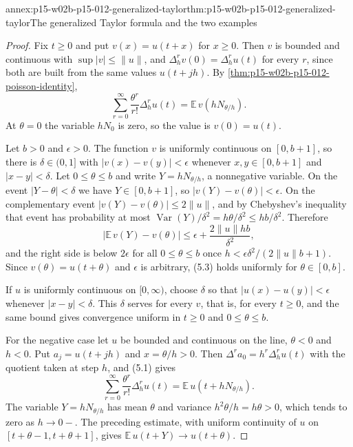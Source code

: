 \begin{annexitem}{annex:p15-w02b-p15-012-generalized-taylor}{thm:p15-w02b-p15-012-generalized-taylor}{The generalized Taylor formula and the two examples}
\begin{proof}
Fix \(t\geq0\) and put \(v(x)=u(t+x)\) for \(x\geq0\). Then \(v\) is bounded
and continuous with \(\sup|v|\leq\|u\|\), and \(\Delta_h^rv(0)=\Delta_h^ru(t)\)
for every \(r\), since both are built from the same values
\(u(t+jh)\). By \cref{thm:p15-w02b-p15-012-poisson-identity},
\[
 \sum_{r=0}^\infty\frac{\theta^r}{r!}\Delta_h^ru(t)=\mathbb E\,v(hN_{\theta/h}).
\]
At \(\theta=0\) the variable \(hN_0\) is zero, so the value is \(v(0)=u(t)\).

Let \(b>0\) and \(\epsilon>0\). The function \(v\) is uniformly continuous on
\([0,b+1]\), so there is \(\delta\in(0,1]\) with \(|v(x)-v(y)|<\epsilon\)
whenever \(x,y\in[0,b+1]\) and \(|x-y|<\delta\). Let
\(0\leq\theta\leq b\) and write \(Y=hN_{\theta/h}\), a nonnegative variable.
On the event \(|Y-\theta|<\delta\) we have \(Y\in[0,b+1]\), so
\(|v(Y)-v(\theta)|<\epsilon\). On the complementary event
\(|v(Y)-v(\theta)|\leq2\|u\|\), and by Chebyshev's inequality that event has
probability at most \(\operatorname{Var}(Y)/\delta^2=h\theta/\delta^2\leq
hb/\delta^2\). Therefore
\[
 \bigl|\mathbb E\,v(Y)-v(\theta)\bigr|\leq\epsilon+\frac{2\|u\|hb}{\delta^2},
\]
and the right side is below \(2\epsilon\) for all \(0\leq\theta\leq b\) once
\(h<\epsilon\delta^2/(2\|u\|b+1)\). Since \(v(\theta)=u(t+\theta)\) and
\(\epsilon\) is arbitrary, (5.3) holds uniformly for \(\theta\in[0,b]\).

If \(u\) is uniformly continuous on \([0,\infty)\), choose \(\delta\) so that
\(|u(x)-u(y)|<\epsilon\) whenever \(|x-y|<\delta\). This \(\delta\) serves
for every \(v\), that is, for every \(t\geq0\), and the same bound gives
convergence uniform in \(t\geq0\) and \(0\leq\theta\leq b\).

For the negative case let \(u\) be bounded and continuous on the line,
\(\theta<0\) and \(h<0\). Put \(a_j=u(t+jh)\) and \(x=\theta/h>0\). Then
\(\Delta^ra_0=h^r\Delta_h^ru(t)\) with the quotient taken at step \(h\), and
(5.1) gives
\[
 \sum_{r=0}^\infty\frac{\theta^r}{r!}\Delta_h^ru(t)
   =\mathbb E\,u(t+hN_{\theta/h}).
\]
The variable \(Y=hN_{\theta/h}\) has mean \(\theta\) and variance
\(h^2\theta/h=h\theta>0\), which tends to zero as \(h\to0-\). The preceding
estimate, with uniform continuity of \(u\) on \([t+\theta-1,t+\theta+1]\),
gives \(\mathbb E\,u(t+Y)\to u(t+\theta)\).


\end{proof}
\end{annexitem}
